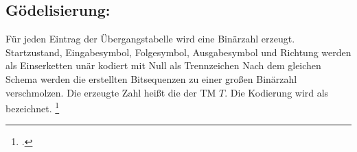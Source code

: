 \documentclass{lehramt-informatik-haupt}
\begin{document}
\subsection{Gödelisierung:}

Für jeden Eintrag der Übergangstabelle wird eine Binärzahl erzeugt.
Startzustand, Eingabesymbol, Folgesymbol, Ausgabesymbol und Richtung
werden als Einserketten unär kodiert mit Null als Trennzeichen Nach dem
gleichen Schema werden die erstellten Bitsequenzen zu einer großen
Binärzahl verschmolzen. Die erzeugte Zahl heißt die 
der TM $T$. Die Kodierung wird als  bezeichnet.
\footcite[Seite 23]{theo:fs:4}

\literatur
\end{document}

